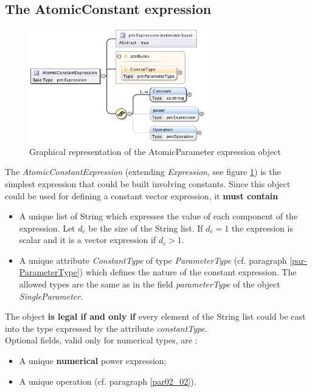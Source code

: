 \documentclass[a4paper,11pt] {ivoa}
\begin{document}
\subsection{The AtomicConstant expression}\label{par02_03}
\begin{figure}[htbp]
\begin{center}
\includegraphics[width=0.7\textwidth]{pictures/AtomicConstant.jpg} 
\caption{Graphical representation of the AtomicParameter expression object}
\label{Pic-AtomicConstant}
\end{center}
\end{figure}

The {\it AtomicConstantExpression} (extending {\it Expression}, see figure \ref{Pic-AtomicConstant})
is the simplest expression that could be built involving constants. Since this object could be used
for defining a constant vector expression, it {\bf must contain}
\begin{itemize}
\item A unique list of String which expresses the value of each component of the expression. Let
$d_c$ be the size of the String list. If $d_c=1$ the expression is scalar and it is a vector
expression if $d_c>1$.
\item A unique attribute {\it ConstantType} of type {\it ParameterType} (cf. paragraph
\ref{par-ParameterType}) which defines the nature of the constant expression. The allowed
types are the same as in the field {\it parameterType} of the object {\it SingleParameter}.
\end{itemize}
The object {\bf is legal if and only if} every element of the String list could be cast into the
type expressed by the attribute {\it constantType}.\\

Optional fields, valid only for numerical types, are : 
\begin{itemize}
\item A unique {\bf numerical} power expression;
\item A unique operation (cf. paragraph \ref{par02_02}).
\end{itemize}
\end{document}
